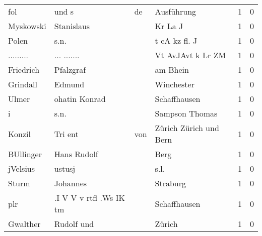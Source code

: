 \documentclass[10pt,a4paper,landscape]{article}
\begin{document}
\begin{longtable}{llllrr}
                      fol &                              und s &          de &                                  Ausführung &          1 &         0 \\
                Myskowski &                         Stanislaus &             &                                     Kr La J &          1 &         0 \\
                    Polen &                               s.n. &             &                               t cA kz fl. J &          1 &         0 \\
                ......... &                        ... ....... &             &                           Vt AvJAvt k Lr ZM &          1 &         0 \\
                Friedrich &                          Pfalzgraf &             &                                    am Bhein &          1 &         0 \\
                 Grindall &                             Edmund &             &                                  Winchester &          1 &         0 \\
                    Ulmer &                      ohatin Konrad &             &                                Schaffhausen &          1 &         0 \\
                        i &                               s.n. &             &                              Sampson Thomas &          1 &         0 \\
                   Konzil &                            Tri ent &         von &                      Zürich Zürich und Bern &          1 &         0 \\
                BUllinger &                        Hans Rudolf &             &                                        Berg &          1 &         0 \\
                 jVelsius &                             ustusj &             &                                        s.l. &          1 &         0 \\
                    Sturm &                           Johannes &             &                                    Straburg &          1 &         0 \\
                      plr &            .I V V v rtfl .Ws IK tm &             &                                Schaffhausen &          1 &         0 \\
                 Gwalther &                         Rudolf und &             &                                      Zürich &          1 &         0 \\

\end{longtable}
\end{document}
